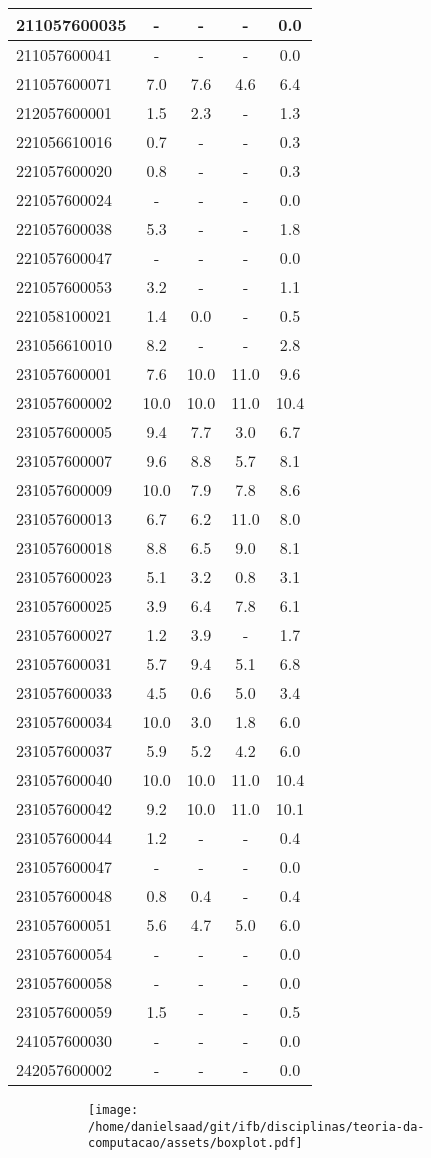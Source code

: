 \documentclass{article}
\begin{document}
\begin{longtable}{|l|c|c|c|c|}
211057600035 & - & - & - & 0.0\\\hline
211057600041 & - & - & - & 0.0\\\hline
211057600071 & 7.0 & 7.6 & 4.6 & 6.4\\\hline
212057600001 & 1.5 & 2.3 & - & 1.3\\\hline
221056610016 & 0.7 & - & - & 0.3\\\hline
221057600020 & 0.8 & - & - & 0.3\\\hline
221057600024 & - & - & - & 0.0\\\hline
221057600038 & 5.3 & - & - & 1.8\\\hline
221057600047 & - & - & - & 0.0\\\hline
221057600053 & 3.2 & - & - & 1.1\\\hline
221058100021 & 1.4 & 0.0 & - & 0.5\\\hline
231056610010 & 8.2 & - & - & 2.8\\\hline
231057600001 & 7.6 & 10.0 & 11.0 & 9.6\\\hline
231057600002 & 10.0 & 10.0 & 11.0 & 10.4\\\hline
231057600005 & 9.4 & 7.7 & 3.0 & 6.7\\\hline
231057600007 & 9.6 & 8.8 & 5.7 & 8.1\\\hline
231057600009 & 10.0 & 7.9 & 7.8 & 8.6\\\hline
231057600013 & 6.7 & 6.2 & 11.0 & 8.0\\\hline
231057600018 & 8.8 & 6.5 & 9.0 & 8.1\\\hline
231057600023 & 5.1 & 3.2 & 0.8 & 3.1\\\hline
231057600025 & 3.9 & 6.4 & 7.8 & 6.1\\\hline
231057600027 & 1.2 & 3.9 & - & 1.7\\\hline
231057600031 & 5.7 & 9.4 & 5.1 & 6.8\\\hline
231057600033 & 4.5 & 0.6 & 5.0 & 3.4\\\hline
231057600034 & 10.0 & 3.0 & 1.8 & 6.0\\\hline
231057600037 & 5.9 & 5.2 & 4.2 & 6.0\\\hline
231057600040 & 10.0 & 10.0 & 11.0 & 10.4\\\hline
231057600042 & 9.2 & 10.0 & 11.0 & 10.1\\\hline
231057600044 & 1.2 & - & - & 0.4\\\hline
231057600047 & - & - & - & 0.0\\\hline
231057600048 & 0.8 & 0.4 & - & 0.4\\\hline
231057600051 & 5.6 & 4.7 & 5.0 & 6.0\\\hline
231057600054 & - & - & - & 0.0\\\hline
231057600058 & - & - & - & 0.0\\\hline
231057600059 & 1.5 & - & - & 0.5\\\hline
241057600030 & - & - & - & 0.0\\\hline
242057600002 & - & - & - & 0.0\\\hline
\end{longtable}
\begin{figure}[h!]
\centering\begin{subfigure}
        \centering
        \texttt{[image: /home/danielsaad/git/ifb/disciplinas/teoria-da-computacao/assets/boxplot.pdf]}
    \end{subfigure}\end{figure}
\end{document}
